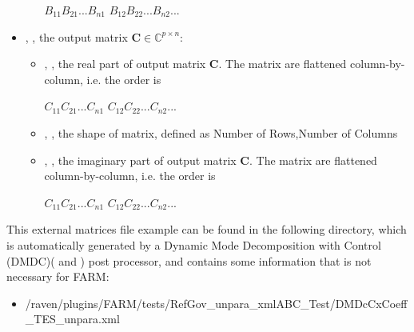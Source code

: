 \begin{itemize}
\begin{itemize}
    \begin{math} B_{11} B_{21} ... B_{n1} \end{math} \begin{math}B_{12} B_{22} ... B_{n2} ... \end{math}
  \end{itemize}
  
  \item {}, , 
  the output matrix \begin{math} \textbf{C}\in\mathbb{C}^{p \times n} \end{math}:
  \begin{itemize}
    \item {}, , 
    the real part of output matrix \begin{math} \textbf{C} \end{math}. The matrix are flattened 
    column-by-column, i.e. the order is 

    \begin{math} C_{11} C_{21} ... C_{n1} \end{math} \begin{math}C_{12} C_{22} ... C_{n2} ... \end{math}
    \item {}, , 
    the shape of matrix, defined as Number of Rows,Number of Columns
    \item {}, , 
    the imaginary part of output matrix \begin{math} \textbf{C} \end{math}. The matrix are flattened 
    column-by-column, i.e. the order is 

    \begin{math} C_{11} C_{21} ... C_{n1} \end{math} \begin{math}C_{12} C_{22} ... C_{n2} ... \end{math}
  \end{itemize}
    
\end{itemize}

This external matrices file example can be found in the following directory, which is automatically generated by a 
Dynamic Mode Decomposition with Control (DMDC)(\cite{proctor2016dynamic} and \cite{wang2020DMDc}) post processor, 
and contains some information that is not necessary for FARM:
\begin{itemize}
  \item /raven/plugins/FARM/tests/RefGov\_unpara\_xmlABC\_Test/DMDcCxCoeff\_TES\_unpara.xml
\end{itemize}


